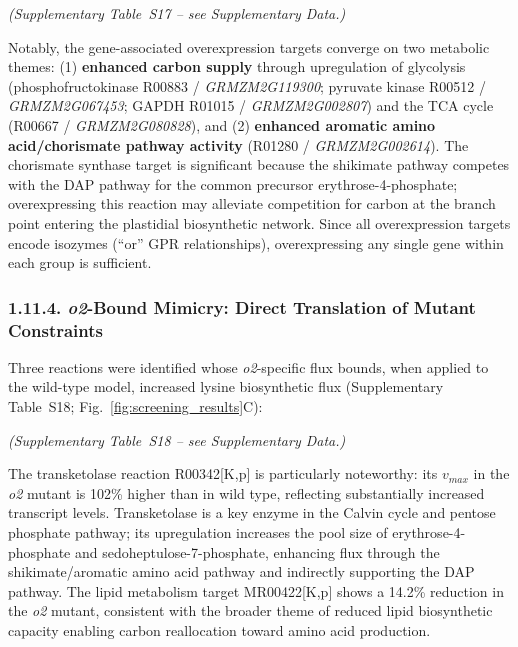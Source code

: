 \documentclass[12pt,a4paper]{article}
\begin{document}
\noindent\textit{(Supplementary Table~S17 -- see Supplementary Data.)}


Notably, the gene-associated overexpression targets converge on two metabolic themes: (1) \textbf{enhanced carbon supply} through upregulation of glycolysis (phosphofructokinase R00883 / \textit{GRMZM2G119300}; pyruvate kinase R00512 / \textit{GRMZM2G067453}; GAPDH R01015 / \textit{GRMZM2G002807}) and the TCA cycle (R00667 / \textit{GRMZM2G080828}), and (2) \textbf{enhanced aromatic amino acid/chorismate pathway activity} (R01280 / \textit{GRMZM2G002614}). The chorismate synthase target is significant because the shikimate pathway competes with the DAP pathway for the common precursor erythrose-4-phosphate; overexpressing this reaction may alleviate competition for carbon at the branch point entering the plastidial biosynthetic network. Since all overexpression targets encode isozymes (``or'' GPR relationships), overexpressing any single gene within each group is sufficient.

\subsubsection{1.11.4. \textit{o2}-Bound Mimicry: Direct Translation of Mutant Constraints}

Three reactions were identified whose \textit{o2}-specific flux bounds, when applied to the wild-type model, increased lysine biosynthetic flux (Supplementary Table~S18; Fig.~\ref{fig:screening_results}C):


\noindent\textit{(Supplementary Table~S18 -- see Supplementary Data.)}


The transketolase reaction R00342[K,p] is particularly noteworthy: its $v_{max}$ in the \textit{o2} mutant is 102\% higher than in wild type, reflecting substantially increased transcript levels. Transketolase is a key enzyme in the Calvin cycle and pentose phosphate pathway; its upregulation increases the pool size of erythrose-4-phosphate and sedoheptulose-7-phosphate, enhancing flux through the shikimate/aromatic amino acid pathway and indirectly supporting the DAP pathway. The lipid metabolism target MR00422[K,p] shows a 14.2\% reduction in the \textit{o2} mutant, consistent with the broader theme of reduced lipid biosynthetic capacity enabling carbon reallocation toward amino acid production.
\end{document}
